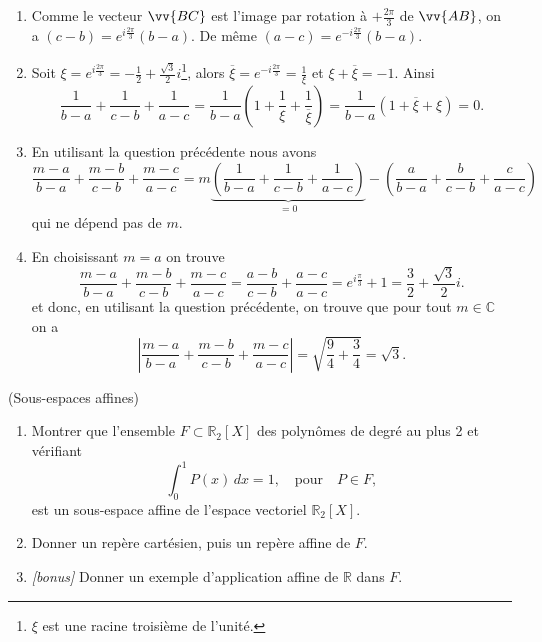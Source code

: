 \documentclass[a4paper,12pt,reqno]{amsart}
\begin{document}
\begin{solution}

  \begin{enumerate}
    \item Comme le vecteur $\vv{BC}$ est l'image par rotation à $+\frac{2 \pi}{3}$ de $\vv{AB}$, on a $(c-b)=e^{i \frac{2 \pi}{3}}(b-a)$. De même $(a-c)=e^{-i \frac{2 \pi}{3}}(b-a)$.
    \item Soit $\xi = e^{i \frac{2 \pi}{3}} = -\frac{1}{2} + \frac{\sqrt{3}}{2}i$\footnote{ $\xi$ est une racine troisième de l'unité.}, alors $\overline{\xi} = e^{-i \frac{2 \pi}{3}} = \frac{1}{\xi}$ et $\xi + \overline{\xi} = -1$. Ainsi
    \[
      \frac{1}{b-a}+\frac{1}{c-b}+\frac{1}{a-c} = \frac{1}{b-a}\left( 1 + \frac{1}{\xi} + \frac{1}{\overline{\xi}} \right) = \frac{1}{b-a}\left( 1 + \overline{\xi} + \xi \right) = 0.
    \]
    \item En utilisant la question précédente nous avons
    \[
      \frac{m-a}{b-a}+\frac{m-b}{c-b}+\frac{m-c}{a-c} = m \underbrace{\left( \frac{1}{b-a}+\frac{1}{c-b}+\frac{1}{a-c} \right)}_{=0} - \left( \frac{a}{b-a}+\frac{b}{c-b}+\frac{c}{a-c} \right)
    \]
    qui ne dépend pas de $m$.
    \item En choisissant $m=a$ on trouve
    \[
      \frac{m-a}{b-a}+\frac{m-b}{c-b}+\frac{m-c}{a-c} = \frac{a-b}{c-b}+\frac{a-c}{a-c} = e^{i \frac{\pi}{3}} + 1 = \frac{3}{2}+\frac{\sqrt{3}}{2}i.
    \]
    et donc, en utilisant la question précédente, on trouve que pour tout $m \in \mathbb{C}$ on a
    \[
      \left| \frac{m-a}{b-a}+\frac{m-b}{c-b}+\frac{m-c}{a-c} \right| = \sqrt{\frac{9}{4}+\frac{3}{4}} = \sqrt{3}.
    \]
  \end{enumerate}
\end{solution}

\begin{exo} (Sous-espaces affines)

  \begin{enumerate}

    \item Montrer que l'ensemble $F \subset \mathbb{R}_{2}[X] $ des polynômes de degré au plus 2 et vérifiant
    \[
      \int_{0}^{1} P(x) \,dx = 1, \quad \text{pour} \quad P \in F,
    \]
    est un sous-espace affine de l'espace vectoriel $\mathbb{R}_{2}[X]$.

    \item Donner un repère cartésien, puis un repère affine de $F$.

    \item\emph{[bonus]} Donner un exemple d'application affine de $\mathbb{R}$ dans $F$.
   \end{enumerate}

\end{exo}
\end{document}
